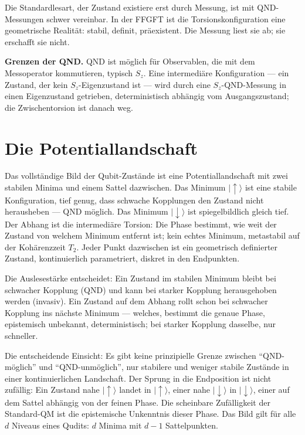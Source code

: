 Die Standardlesart, der Zustand existiere erst durch Messung, ist mit
QND-Messungen schwer vereinbar. In der FFGFT ist die
Torsionskonfiguration eine geometrische Realität: stabil, definit,
präexistent. Die Messung liest sie ab; sie erschafft sie nicht.

\textbf{Grenzen der QND.} QND ist möglich für Observablen, die mit dem
Messoperator kommutieren, typisch $S_z$. Eine intermediäre Konfiguration
--- ein Zustand, der kein $S_z$-Eigenzustand ist --- wird durch eine
$S_z$-QND-Messung in einen Eigenzustand getrieben, deterministisch
abhängig vom Ausgangszustand; die Zwischentorsion ist danach weg.

\section{Die Potentiallandschaft}

Das vollständige Bild der Qubit-Zustände ist eine Potentiallandschaft
mit zwei stabilen Minima und einem Sattel dazwischen. Das Minimum
$|\uparrow\rangle$ ist eine stabile Konfiguration, tief genug, dass
schwache Kopplungen den Zustand nicht herausheben --- QND möglich. Das
Minimum $|\downarrow\rangle$ ist spiegelbildlich gleich tief. Der Abhang
ist die intermediäre Torsion: Die Phase bestimmt, wie weit der Zustand
von welchem Minimum entfernt ist; kein echtes Minimum, metastabil auf
der Kohärenzzeit $T_2$. Jeder Punkt dazwischen ist ein geometrisch
definierter Zustand, kontinuierlich parametriert, diskret in den
Endpunkten.

Die Auslesestärke entscheidet: Ein Zustand im stabilen Minimum bleibt
bei schwacher Kopplung (QND) und kann bei starker Kopplung herausgehoben
werden (invasiv). Ein Zustand auf dem Abhang rollt schon bei schwacher
Kopplung ins nächste Minimum --- welches, bestimmt die genaue Phase,
epistemisch unbekannt, deterministisch; bei starker Kopplung dasselbe,
nur schneller.

Die entscheidende Einsicht: Es gibt keine prinzipielle Grenze zwischen
\enquote{QND-möglich} und \enquote{QND-unmöglich}, nur stabilere und
weniger stabile Zustände in einer kontinuierlichen Landschaft. Der
Sprung in die Endposition ist nicht zufällig: Ein Zustand nahe
$|\uparrow\rangle$ landet in $|\uparrow\rangle$, einer nahe
$|\downarrow\rangle$ in $|\downarrow\rangle$, einer auf dem Sattel
abhängig von der feinen Phase. Die scheinbare Zufälligkeit der
Standard-QM ist die epistemische Unkenntnis dieser Phase. Das Bild gilt
für alle $d$ Niveaus eines Qudits: $d$ Minima mit $d-1$ Sattelpunkten.

